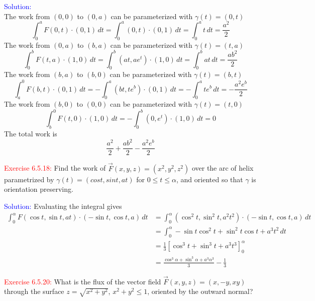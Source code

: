 \documentclass[12pt]{article}
\begin{document}
\bigskip

\textcolor{blue}{Solution:} \\
    The work from $(0, 0)$ to $(0, a)$ can be parameterized with 
    $\gamma(t) = (0, t)$
    \[
        \int_0^a F(0, t) \cdot (0, 1) \,dt
        = \int_0^a (0, t) \cdot (0, 1) \,dt
        = \int_0^a t \,dt
        = \frac{a^2}{2} 
    \]
    The work from $(0, a)$ to $(b, a)$ can be parameterized with 
    $\gamma(t) = (t, a)$
    \[
        \int_0^b F(t, a) \cdot (1, 0) \,dt
        = \int_0^b (at, ae^t) \cdot (1, 0) \,dt
        = \int_0^b at \,dt
        = \frac{ab^2}{2} 
    \]
    The work from $(b, a)$ to $(b, 0)$ can be parameterized with 
    $\gamma(t) = (b, t)$
    \[
        \int_a^0 F(b, t) \cdot (0, 1) \,dt
        = -\int_0^a (bt, te^b) \cdot (0, 1) \,dt
        = -\int_0^a te^b \,dt
        = - \frac{a^2e^b}{2} 
    \]
    The work from $(b, 0)$ to $(0, 0)$ can be parameterized with 
    $\gamma(t) = (t, 0)$
    \[
        \int_b^0 F(t, 0) \cdot (1, 0) \,dt
        = -\int_0^b (0, e^t) \cdot (1, 0) \,dt
        = 0
    \]
    The total work is 
    \[
        \frac{a^2}{2} + \frac{ab^2}{2} - \frac{a^2e^b}{2} 
    \]
\newpage



\textcolor{red}{Exercise 6.5.18:}
Find the work of $\vec F(x,y,z) = (x^2,y^2,z^2)$ over the arc of helix parametrized by $\gamma(t) = (cost,sint,at)$ for $0\leq t\leq \alpha$, and oriented so that $\gamma$ is orientation preserving.


\bigskip

\textcolor{blue}{Solution:}
    Evaluating the integral gives 
    \begin{align*}
        \int_0^\alpha F(\cos t, \sin t, at) \cdot (-\sin t, \cos t, a) \,dt
        &= \int_0^\alpha (\cos^2 t, \sin^2 t, a^2t^2) \cdot (-\sin t, \cos t, a) \,dt \\
        &= \int_0^\alpha -\sin t\cos^2 t + \sin^2 t \cos t + a^3t^2 \,dt \\
        &= \frac{1}{3}\left[\cos^3 t + \sin^3 t + a^3t^3\right]_0^\alpha \\
        &= \frac{\cos^3 \alpha + \sin^3 \alpha + a^3\alpha^3}{3} - \frac{1}{3}
    \end{align*}
\newpage





\textcolor{red}{Exercise 6.5.20:}
What is the flux of the vector field $\vec F(x,y,z) = (x,-y,xy)$ through the surface $z = \sqrt{x^2+y^2}$, $x^2+y^2\leq 1$, oriented by the outward normal?
\end{document}
